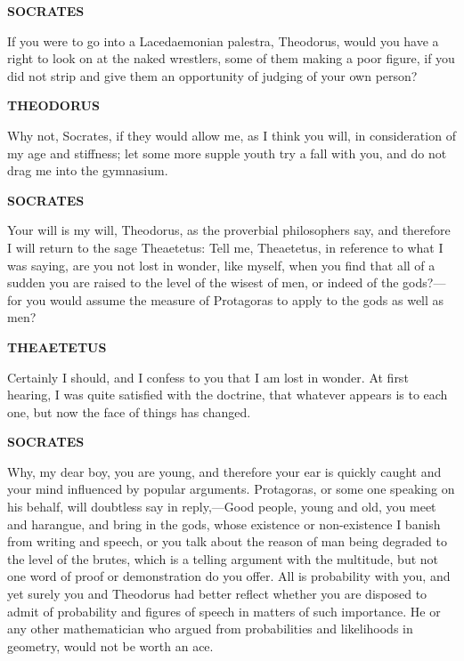 \documentclass[11pt,letter]{article}
\begin{document}
\par \textbf{SOCRATES}
\par   If you were to go into a Lacedaemonian palestra, Theodorus, would you have a right to look on at the naked wrestlers, some of them making a poor figure, if you did not strip and give them an opportunity of judging of your own person?

\par \textbf{THEODORUS}
\par   Why not, Socrates, if they would allow me, as I think you will, in consideration of my age and stiffness; let some more supple youth try a fall with you, and do not drag me into the gymnasium.

\par \textbf{SOCRATES}
\par   Your will is my will, Theodorus, as the proverbial philosophers say, and therefore I will return to the sage Theaetetus:  Tell me, Theaetetus, in reference to what I was saying, are you not lost in wonder, like myself, when you find that all of a sudden you are raised to the level of the wisest of men, or indeed of the gods?—for you would assume the measure of Protagoras to apply to the gods as well as men?

\par \textbf{THEAETETUS}
\par   Certainly I should, and I confess to you that I am lost in wonder. At first hearing, I was quite satisfied with the doctrine, that whatever appears is to each one, but now the face of things has changed.

\par \textbf{SOCRATES}
\par   Why, my dear boy, you are young, and therefore your ear is quickly caught and your mind influenced by popular arguments. Protagoras, or some one speaking on his behalf, will doubtless say in reply,—Good people, young and old, you meet and harangue, and bring in the gods, whose existence or non-existence I banish from writing and speech, or you talk about the reason of man being degraded to the level of the brutes, which is a telling argument with the multitude, but not one word of proof or demonstration do you offer. All is probability with you, and yet surely you and Theodorus had better reflect whether you are disposed to admit of probability and figures of speech in matters of such importance. He or any other mathematician who argued from probabilities and likelihoods in geometry, would not be worth an ace.
\end{document}
